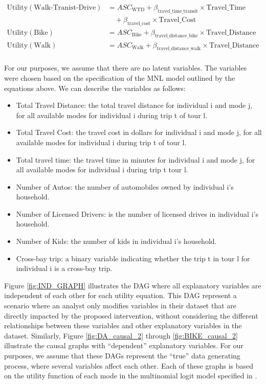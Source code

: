 \begin{equation*}
\begin{aligned}
   \textrm{Utility} \left(\textrm{Walk-Tranist-Drive}\right) &= ASC_{\textrm{WTD}} + \beta_{\textrm{travel\_time\_transit}} \times \textrm{Travel\_Time} \\
   &\quad + \beta_{\textrm{travel\_cost}} \times \textrm{Travel\_Cost} \\
   \textrm{Utility} \left(\textrm{Bike}\right) &= ASC_{\textrm{Bike}} + \beta_{\textrm{travel\_distance\_bike}} \times \textrm{Travel\_Distance} \\
   \textrm{Utility} \left(\textrm{Walk}\right) &= ASC_{\textrm{Walk}} + \beta_{\textrm{travel\_distance\_walk}} \times \textrm{Travel\_Distance} \\
   \end{aligned}
\end{equation*}


For our purposes, we assume that there are no latent variables.
The variables were chosen based on the specification of the MNL model outlined by the equations above.
We can describe the variables as follows:

\begin{itemize}
  \item Total Travel Distance: the total travel distance for individual i and mode j, for all available modes for individual i during trip t of tour l.
  \item Total Travel Cost: the travel cost in dollars for individual i and mode j, for all available modes for individual i during trip t of tour l.
  \item Total travel time: the travel time in minutes for individual i and mode j, for all available modes for individual i during trip t tour l.
  \item Number of Autos: the number of automobiles owned by individual i's household.
  \item Number of Licensed Drivers: is the number of licensed drives in individual i's household.
  \item Number of Kids: the number of kids in individual i's household.
  \item Cross-bay trip: a binary variable indicating whether the trip t in tour l for individual i is a cross-bay trip.
\end{itemize}

Figure \ref{fig:IND_GRAPH} illustrates the DAG where all explanatory variables are independent of each other for each utility equation.
This DAG represent a scenario where an analyst only modifies variables in their dataset that are directly impacted by the proposed intervention, without considering the different relationships between these variables and other explanatory variables in the dataset.
Similarly, Figure \ref{fig:DA_causal_2} through \ref{fig:BIKE_causal_2} illustrate the causal graphs with ``dependent'' explanatory variables.
For our purposes, we assume that these DAGs represent the ``true'' data generating process, where several variables affect each other.
Each of these graphs is based on the utility function of each mode in the multinomial logit model specified in \citet{brathwaite_asymmetric}.

